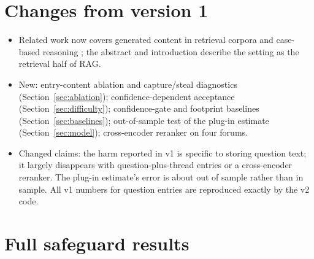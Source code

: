 \documentclass[11pt]{article}
\begin{document}
\section*{Changes from version 1}
\begin{itemize}
\item Related work now covers generated content in retrieval corpora \citep{chen2024spiral,dai2024sourcebias,yu2026collapse,druck2026ragcollapse} and case-based reasoning \citep{aamodt1994cbr,smyth1995forget,zhu1999add}; the abstract and introduction describe the setting as the retrieval half of RAG.
\item New: entry-content ablation and capture/steal diagnostics (Section~\ref{sec:ablation}); confidence-dependent acceptance (Section~\ref{sec:difficulty}); confidence-gate and footprint baselines (Section~\ref{sec:baselines}); out-of-sample test of the plug-in estimate (Section~\ref{sec:model}); cross-encoder reranker on four forums.
\item Changed claims: the harm reported in v1 is specific to storing question text; it largely disappears with question-plus-thread entries or a cross-encoder reranker. The plug-in estimate's error is about \oosMAEAskTh{} out of sample rather than \plugMAE{} in sample. All v1 numbers for question entries are reproduced exactly by the v2 code.
\end{itemize}



\appendix
\section{Full safeguard results}\label{app:safe}
\begin{table}[h]\centering\scriptsize

\caption{Paired change in top-1 accuracy (points, 95\% interval over ten orders) relative to no write-back, for the dense retrievers.}
\label{tab:safe}
\end{table}
\begin{table}[h]\centering\scriptsize

\caption{Crossover $p^*$ (95\% bootstrap interval) by entry content, naive write-back unless stated.}
\label{tab:ablcross}
\end{table}
\begin{table}[h]\centering\scriptsize

\caption{Crossover and change at $p_w=0.95$ under constant and confidence-dependent acceptance, question entries.}
\label{tab:diff}
\end{table}
\end{document}
